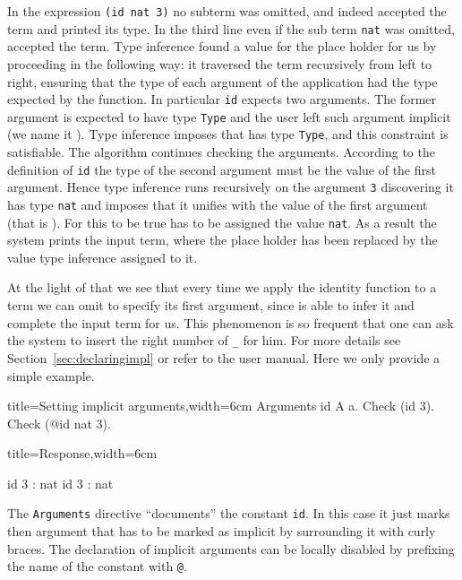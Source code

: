 In the expression \lstinline/(id nat 3)/ no subterm was omitted, and
indeed \Coq{} accepted the term and printed its type.  In the third
line even if the sub term \lstinline/nat/ was omitted, \Coq{} accepted
the term.  Type inference found a value for the place holder
for us by proceeding in the following way:  it traversed the term
recursively from left to right, ensuring that the type of each
argument of the application had the type expected by the function.  In
particular \lstinline/id/ expects two arguments.
The former argument is expected to have type \lstinline/Type/ and the
user left such argument implicit (we name it ).   Type
inference imposes that  has type \lstinline/Type/, and this
constraint is satisfiable.  The algorithm continues checking the
arguments.  According to the definition of \lstinline/id/ the type of
the second argument must be the value of the first argument.  Hence
type inference runs recursively on the argument \lstinline/3/
discovering it has type \lstinline/nat/ and imposes that it unifies
with the value of the first argument (that is ).  For this
to be true  has to be assigned the value \lstinline/nat/.
As a result the system prints the input term, where the place holder
has been replaced by the value type inference assigned to it.

At the light of that we see that every time we apply the identity
function to a term we can omit to specify its first argument,
since \Coq{} is able to infer it and complete the input term for us.
This phenomenon is so frequent that one can ask the system to insert
the right number of \lstinline/_/ for him.  For more details see
Section~\ref{sec:declaringimpl} or refer to the user manual.  Here
we only provide a simple example.

\begin{coq}{title=Setting implicit arguments,width=6cm}
Arguments id {A} a.
Check (id 3).
Check (@id nat 3).
\end{coq}
\begin{coqout}{title=Response,width=6cm}

id 3 : nat
id 3 : nat
\end{coqout}

The \lstinline/Arguments/ directive ``documents'' the constant
\lstinline/id/.  In this case it just marks then argument that has to
be marked as implicit by surrounding it with curly braces.
The declaration of implicit arguments can be locally disabled by
prefixing the name of the constant with \lstinline/@/.

